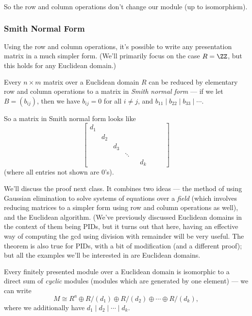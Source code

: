 So the row and column operations don't change our module (up to isomorphism). 

\subsubsection{Smith Normal Form}

Using the row and column operations, it's possible to write any presentation matrix in a much simpler form. (We'll primarily focus on the case $R = \ZZ$, but this holds for any Euclidean domain.)

\begin{theorem} \label{Smith normal form}
Every $n \times m$ matrix over a Euclidean domain $R$ can be reduced by elementary row and column operations to a matrix in \emph{Smith normal form} --- if we let $B = (b_{ij})$, then we have $b_{ij} = 0$ for all $i \neq j$, and $b_{11} \mid b_{22} \mid b_{33} \mid \cdots$.  %
\end{theorem}

So a matrix in Smith normal form looks like \[\begin{bmatrix} d_1 \\ & d_2 \\ & & d_3 \\ & & & \ddots \\ & & & & & d_k & & & \end{bmatrix}\] (where all entries not shown are $0$'s). 

We'll discuss the proof next class. It combines two ideas --- the method of using Gaussian elimination to solve systems of equations over a \emph{field} (which involves reducing matrices to a simpler form using row and column operations as well), and the Euclidean algorithm. (We've previously discussed Euclidean domains in the context of them being PIDs, but it turns out that here, having an effective way of computing the gcd using division with remainder will be very useful. The theorem is also true for PIDs, with a bit of modification (and a different proof); but all the examples we'll be interested in are Euclidean domains. 


\begin{corollary}
Every finitely presented module over a Euclidean domain is isomorphic to a direct sum of \emph{cyclic} modules (modules which are generated by one element) --- we can write \[M \cong R^a \oplus R/(d_1) \oplus R/(d_2) \oplus \cdots \oplus R/(d_k),\] where we additionally have $d_1 \mid d_2 \mid \cdots \mid d_k$. 
\end{corollary}

